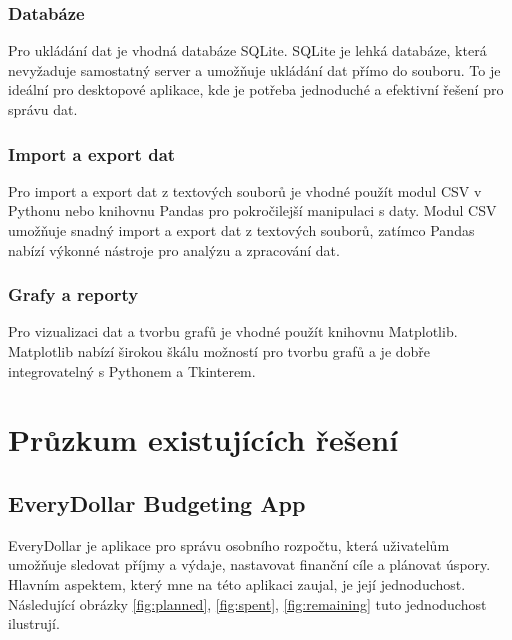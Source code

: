 \documentclass[
program=itk,
biblatex,
language=czech,
font=sans,
figures=false,
tables=false,
theorems,
sourcecodes,
glossaries,
index
]{kidiplom}
\begin{document}
\subsubsection{Databáze}
Pro ukládání dat je vhodná databáze SQLite. SQLite je lehká databáze, která nevyžaduje samostatný server a umožňuje ukládání dat přímo do souboru. To je ideální pro desktopové aplikace, kde je potřeba jednoduché a efektivní řešení pro správu dat.

\subsubsection{Import a export dat}
Pro import a export dat z textových souborů je vhodné použít modul CSV v Pythonu nebo knihovnu Pandas pro pokročilejší manipulaci s daty. Modul CSV umožňuje snadný import a export dat z textových souborů, zatímco Pandas nabízí výkonné nástroje pro analýzu a zpracování dat.

\subsubsection{Grafy a reporty}
Pro vizualizaci dat a tvorbu grafů je vhodné použít knihovnu Matplotlib. Matplotlib nabízí širokou škálu možností pro tvorbu grafů a je dobře integrovatelný s Pythonem a Tkinterem.

\section{Průzkum existujících řešení}
\subsection{EveryDollar Budgeting App}
EveryDollar je aplikace pro správu osobního rozpočtu, která uživatelům umožňuje sledovat příjmy a výdaje, nastavovat finanční cíle a plánovat úspory. Hlavním aspektem, který mne na této aplikaci zaujal, je její jednoduchost. Následující obrázky \ref{fig:planned}, \ref{fig:spent}, \ref{fig:remaining} tuto jednoduchost ilustrují. 
\end{document}
